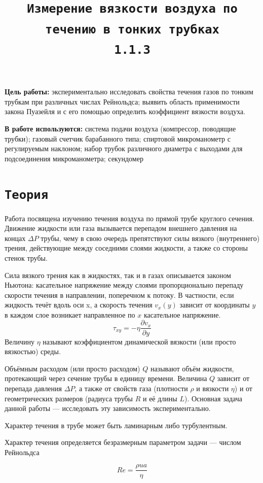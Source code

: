 \documentclass[11pt,a4paper]{article}
\title{\texttt{Измерение вязкости воздуха по течению в тонких трубках \\ 1.1.3}}
\author{}
\date{}
\begin{document}
\maketitle
\textbf{Цель работы:} экспериментально исследовать свойства течения газов по тонким трубкам при различных числах Рейнольдса; выявить область применимости закона Пуазейля и с его помощью определить коэффициент вязкости воздуха.

\textbf{В работе используются:} система подачи воздуха (компрессор, поводящие трубки); газовый счетчик барабанного типа; спиртовой микроманометр с регулируемым наклоном; 
набор трубок различного диаметра с выходами для подсоединения микроманометра; секундомер

\section*{\texttt{Теория}}

Работа посвящена изучению течения воздуха по прямой трубе круглого сечения. Движение жидкости или газа вызывается перепадом внешнего давления на концах $\Delta P$ трубы, чему в свою очередь препятствуют силы вязкого (внутреннего) трения, действующие между соседними слоями жидкости, а также со стороны стенок трубы.

Сила вязкого трения как в жидкостях, так и в газах описывается законом
Ньютона: касательное напряжение между слоями пропорционально перепаду
скорости течения в направлении, поперечном к потоку. В частности, если жидкость течёт вдоль оси x,  а скорость течения $v_{x}(y)$ зависит от координаты $y$  в каждом слое возникает направленное по $x$ касательное напряжение.
\[\tau_{xy} = -\eta \frac{\partial v_x}{\partial y}\]
Величину $\eta$ называют коэффициентом динамической вязкости (или просто вязкостью) среды.

Объёмным расходом (или просто расходом) $Q$ называют объём жидкости,
протекающий через сечение трубы в единицу времени. Величина $Q$ зависит от
перепада давления $\Delta P$, а также от свойств газа (плотности $\rho$ и вязкости $\eta$) и от
геометрических размеров (радиуса трубы $R$ и её длины $L$). Основная задача
данной работы — исследовать эту зависимость экспериментально.

Характер течения в трубе может быть ламинарным либо турбулентным. 

Характер течения определяется безразмерным параметром задачи — числом Рейнольдса

$$ Re = \frac{\rho u a}{\eta}$$ 
\end{document}
